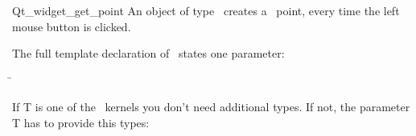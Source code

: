 
\begin{ccRefClass}{Qt_widget_get_point}
\ccDefinition
An object of type \ccRefName\ creates a \cgal\ point, every time 
the left mouse button is clicked.


\ccParameters

The full template declaration of \ccClassTemplateName\ states one parameter:

\begin{tabbing}
 \=\\
\end{tabbing}

If T is one of the \cgal\ kernels you don't need additional types. If
not, the parameter T has to provide this types:

\ccTypes
{}

\ccInheritsFrom
{}

\ccGlue

\ccCreation
{}


\end{ccRefClass}









